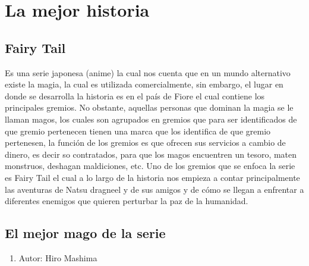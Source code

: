 \documentclass[a5paper,11pt]{article}
\begin{document}
\pagecolor{pink}
\hspace{0.5cm}{\textbf{\huge\textsf{\textcolor{cyan}{EL} 
\textcolor{red}{MEJOR} \textcolor{RubineRed}{ANIME} \textcolor{YellowOrange}{DEL}}}}

\hspace{2.5cm}{\textbf{{\huge\textsf{\textcolor{LimeGreen}{UNIVERSO}}}}}

\section{La mejor historia}
\subsection{Fairy Tail}
 Es una serie japonesa (anime) la cual nos cuenta que en un mundo alternativo existe la magia, la cual es utilizada comercialmente, sin embargo, el lugar en donde se desarrolla la historia es en el país de Fiore el cual contiene los principales gremios. No obstante, aquellas personas que dominan la magia se le llaman magos, los cuales son agrupados en gremios que para ser identificados de que gremio pertenecen tienen una marca que los identifica de que gremio pertenesen, la función de los gremios es que ofrecen sus servicios a cambio de dinero, es decir so contratados, para que los magos encuentren un tesoro, maten monstruos, deshagan maldiciones, etc. Uno de los gremios que se enfoca la serie es Fairy Tail el cual a lo largo de la historia nos empieza a contar principalmente las aventuras de Natsu dragneel y de sus amigos y de cómo se llegan a enfrentar a diferentes enemigos que quieren perturbar la paz de la humanidad.
 
\subsection{El mejor mago de la serie} 
\begin{enumerate}
    \item Autor: Hiro Mashima
\end{enumerate}
\end{document}
